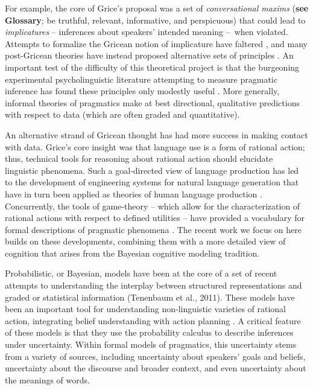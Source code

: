 \documentclass[]{elsarticle}
\begin{document}
For example, the core of Grice's proposal was a set of
\emph{conversational maxims} (\textbf{see Glossary}; be truthful,
relevant, informative, and perspicuous) that could lead to
\emph{implicatures} -- inferences about speakers' intended meaning
--~when violated. Attempts to formalize the Gricean notion of
implicature have faltered \cite[e.g.,][]{hirschberg1985}, and many
post-Gricean theories have instead proposed alternative sets of
principles \citep{sperber1985,levinson2000}. An important test
of the difficulty of this theoretical project is that the burgeoning
experimental psycholinguistic literature attempting to measure pragmatic
inference has found these principles only modestly useful \citep{breheny2006,huang2009,noveck2008}. More
generally, informal theories of pragmatics make at best directional,
qualitative predictions with respect to data (which are often graded and
quantitative).

An alternative strand of Gricean thought has had more success in making
contact with data. Grice's core insight was that language use is a form
of rational action; thus, technical tools for reasoning about rational
action should elucidate linguistic phenomena. Such a goal-directed view
of language production has led to the development of engineering systems
for natural language generation \cite{dale1995} that have in turn
been applied as theories of human language production \cite[e.g.,][]{viethen2006}. Concurrently, the tools of game-theory -- which allow for
the characterization of rational actions with respect to defined
utilities -- have provided a vocabulary for formal descriptions of
pragmatic phenomena \cite{benz2006}. The recent work we focus on
here builds on these developments, combining them with a more detailed
view of cognition that arises from the Bayesian cognitive modeling
tradition.

Probabilistic, or Bayesian, models have been at the core of a set of
recent attempts to understanding the interplay between structured
representations and graded or statistical information (Tenenbaum et al.,
2011). These models have been an important tool for understanding
non-linguistic varieties of rational action, integrating belief
understanding with action planning \cite{baker2009}. A
critical feature of these models is that they use the probability
calculus to describe inferences under uncertainty. Within formal models
of pragmatics, this uncertainty stems from a variety of sources,
including uncertainty about speakers' goals and beliefs, uncertainty
about the discourse and broader context, and even uncertainty about the
meanings of words.
\end{document}
